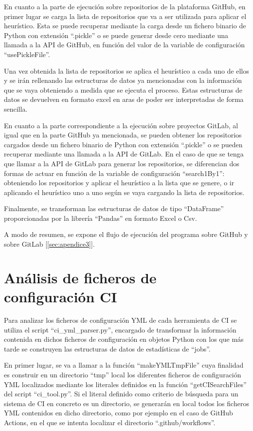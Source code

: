 En cuanto a la parte de ejecución sobre repositorios de la plataforma GitHub, en primer lugar se carga la lista de repositorios que va a ser utilizada para aplicar el heurístico. Esta se puede recuperar mediante la carga desde un fichero binario de Python con extensión ``.pickle'' o se puede generar desde cero mediante una llamada a la API de GitHub, en función del valor de la variable de configuración ``usePickleFile''.

Una vez obtenida la lista de repositorios se aplica el heurístico a cada uno de ellos y se irán rellenando las estructuras de datos ya mencionadas con la información que se vaya obteniendo a medida que se ejecuta el proceso. Estas estructuras de datos se devuelven en formato excel en aras de poder ser interpretadas de forma sencilla.

En cuanto a la parte correspondiente a la ejecución sobre proyectos GitLab, al igual que en la parte GitHub ya mencionada, se pueden obtener los repositorios cargados desde un fichero binario de Python con extensión ``.pickle'' o se pueden recuperar mediante una llamada a la API de GitLab. En el caso de que se tenga que llamar a la API de GitLab para generar los repositorios, se diferencian dos formas de actuar en función de la variable de configuración ``search1By1'': obteniendo los repositorios y aplicar el heurístico a la lista que se genere, o ir aplicando el heurístico uno a uno según se vaya cargando la lista de repositorios.

Finalmente, se transforman las estructuras de datos de tipo ``DataFrame'' proporcionadas por la librería ``Pandas'' en formato Excel o Csv.

A modo de resumen, se expone el flujo de ejecución del programa sobre GitHub y sobre GitLab [\ref{sec:apendice3}].

\section{Análisis de ficheros de configuración CI}
Para analizar los ficheros de configuración YML de cada herramienta de CI se utiliza el script ``ci\_yml\_parser.py'', encargado de transformar la información contenida en dichos ficheros de configuración en objetos Python con los que más tarde se construyen las estructuras de datos de estadísticas de ``jobs''.

En primer lugar, se va a llamar a la función ``makeYMLTmpFile'' cuya finalidad es construir en un directorio ``tmp'' local los diferentes ficheros de configuración YML localizados mediante los literales definidos en la función ``getCISearchFiles'' del script ``ci\_tool.py''. Si el literal definido como criterio de búsqueda para un sistema de CI en concreto es un directorio, se generarán en local todos los ficheros YML contenidos en dicho directorio, como por ejemplo en el caso de GitHub Actions, en el que se intenta localizar el directorio ``.github/workflows''.

